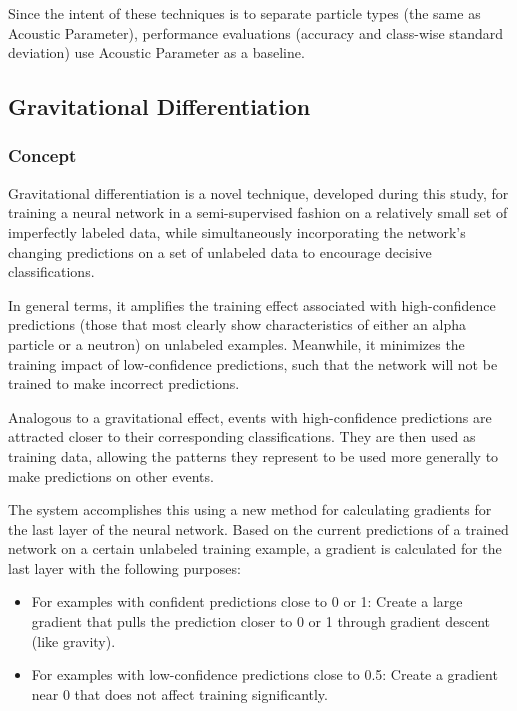 \documentclass[10pt]{article}
\begin{document}
Since the intent of these techniques is to separate particle types (the same as Acoustic Parameter), performance evaluations (accuracy and class-wise standard deviation) use Acoustic Parameter as a baseline.

\subsection{Gravitational Differentiation}

\subsubsection{Concept}

Gravitational differentiation is a novel technique, developed during this study, for training a neural network in a semi-supervised fashion on a relatively small set of imperfectly labeled data, while simultaneously incorporating the network's changing predictions on a set of unlabeled data to encourage decisive classifications.

In general terms, it amplifies the training effect associated with high-confidence predictions (those that most clearly show characteristics of either an alpha particle or a neutron) on unlabeled examples. Meanwhile, it minimizes the training impact of low-confidence predictions, such that the network will not be trained to make incorrect predictions.

Analogous to a gravitational effect, events with high-confidence predictions are attracted closer to their corresponding classifications. They are then used as training data, allowing the patterns they represent to be used more generally to make predictions on other events.

The system accomplishes this using a new method for calculating gradients for the last layer of the neural network. Based on the current predictions of a trained network on a certain unlabeled training example, a gradient is calculated for the last layer with the following purposes:

\begin{itemize}
    \item For examples with confident predictions close to 0 or 1: Create a large gradient that pulls the prediction closer to 0 or 1 through gradient descent (like gravity).
    \item For examples with low-confidence predictions close to 0.5: Create a gradient near 0 that does not affect training significantly.
\end{itemize}
\end{document}
